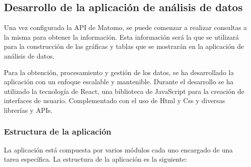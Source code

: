 \subsection{Desarrollo de la aplicación de análisis de datos}
\label{sec:desarrollo-matomo}

Una vez configurada la API de Matomo, se puede comenzar a realizar consultas a la misma para obtener la información. Esta información
será la que se utilizará para la construcción de las gráficas y tablas que se mostrarán en la aplicación de análisis de datos.

Para la obtención, procesamiento y gestión de los datos, se ha desarrollado la aplicación con un enfoque escalable y mantenible.
Durante el desarrollo se ha utilizado la tecnología de React, una biblioteca de JavaScript para la creación de interfaces de usuario.
 Complementado con el uso de Html y Css y diversas librerías y APIs. 

\subsubsection{Estructura de la aplicación}
\label{sec:estructura-aplicacion}

La aplicación está compuesta por varios módulos cada uno encargado de una tarea específica. La estructura de la aplicación es la
siguiente:


